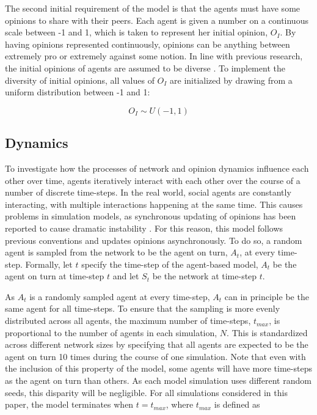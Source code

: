 \documentclass[11pt]{article}
\begin{document}
The second initial requirement of the model is that the agents must have some opinions to share with their peers. Each agent is given a number on a continuous scale between -1 and 1, which is taken to represent her initial opinion, $O_I$. By having opinions represented continuously, opinions can be anything between extremely pro or extremely against some notion. 
In line with previous research, the initial opinions of agents are assumed to be diverse \cite{galesic_integrating_2021, flache_models_2017, flache_between_2018}. To implement the diversity of initial opinions, all values of $O_I$ are initialized by drawing from a uniform distribution between -1 and 1: 

$$O_I \sim U(-1, 1)$$

\subsection{Dynamics}
\label{dynamics}
To investigate how the processes of network and opinion dynamics influence each other over time, agents iteratively interact with each other over the course of a number of discrete time-steps. 
In the real world, social agents are constantly interacting, with multiple interactions happening at the same time. This causes problems in simulation models, as synchronous updating of opinions has been reported to cause dramatic instability \cite{flache_models_2017, sasahara_social_2021, galesic_integrating_2021}. For this reason, this model follows previous conventions and updates opinions asynchronously. To do so, a random agent is sampled from the network to be the agent on turn, $A_t$, at every time-step. 
Formally, let $t$ specify the time-step of the agent-based model, $A_t$ be the agent on turn at time-step $t$ and let $S_t$ be the network at time-step $t$.

As $A_t$ is a randomly sampled agent at every time-step, $A_t$ can in principle be the same agent for all time-steps. To ensure that the sampling is more evenly distributed across all agents, the maximum number of time-steps, $t_{max}$, is proportional to the number of agents in each simulation, $N$. This is standardized across different network sizes by specifying that all agents are expected to be the agent on turn 10 times during the course of one simulation. Note that even with the inclusion of this property of the model, some agents will have more time-steps as the agent on turn than others. As each model simulation uses different random seeds, this disparity will be negligible. For all simulations considered in this paper, the model terminates when $t = t_{max}$, where $t_{max}$ is defined as 
\end{document}
